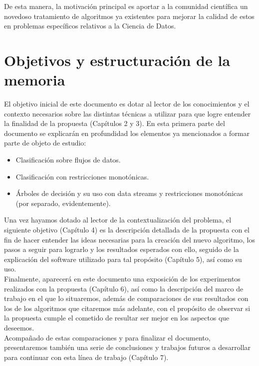 De esta manera, la motivación principal es aportar a la comunidad científica un novedoso tratamiento de algoritmos ya existentes para mejorar la calidad de estos en problemas específicos relativos a la Ciencia de Datos.

\section{Objetivos y estructuración de la memoria}


El objetivo inicial de este documento es dotar al lector de los conocimientos y el contexto necesarios sobre las distintas técnicas a utilizar para que logre entender la finalidad de la propuesta (Capítulos 2 y 3). En esta primera parte del documento se explicarán en profundidad los elementos ya mencionados a formar parte de objeto de estudio:

\begin{itemize}
	\item Clasificación sobre flujos de datos.
	\item Clasificación con restricciones monotónicas.
	\item Árboles de decisión y su uso con data streams y restricciones monotónicas (por separado, evidentemente).
\end{itemize}


Una vez hayamos dotado al lector de la contextualización del problema, el siguiente objetivo (Capítulo 4) es la descripción detallada de la propuesta con el fin de hacer entender las ideas necesarias para la creación del nuevo algoritmo, los pasos a seguir para lograrlo y los resultados esperados con ello, seguido de la explicación del software utilizado para tal propósito (Capítulo 5), así como su uso.\\

Finalmente, aparecerá en este documento una exposición de los experimentos realizados con la propuesta (Capítulo 6), así como la descripción del marco de trabajo en el que lo situaremos, además de comparaciones de sus resultados con los de los algoritmos que citaremos más adelante, con el propósito de observar si la propuesta cumple el cometido de resultar ser mejor en los aspectos que deseemos.\\

Acompañado de estas comparaciones y para finalizar el documento, presentaremos también una serie de conclusiones y trabajos futuros a desarrollar para continuar con esta línea de trabajo (Capítulo 7).

\newpage

